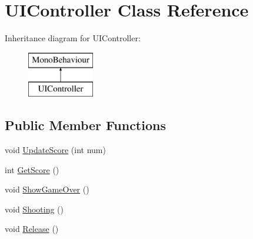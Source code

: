 \hypertarget{class_u_i_controller}{}\section{U\+I\+Controller Class Reference}
\label{class_u_i_controller}
Inheritance diagram for U\+I\+Controller\+:\begin{figure}[H]
\begin{center}
\leavevmode
\includegraphics[height=2.000000cm]{class_u_i_controller}
\end{center}
\end{figure}
\subsection*{Public Member Functions}
\begin{DoxyCompactItemize}
\item 
void \hyperlink{class_u_i_controller_a87a0993fd494e90a55c6414d75467dd7}{Update\+Score} (int num)
\item 
int \hyperlink{class_u_i_controller_a4d9cf4f88502ba97bf5b1956ba24773d}{Get\+Score} ()
\item 
void \hyperlink{class_u_i_controller_a0c9a9ed0d8276bed8374ee2ee484ff0f}{Show\+Game\+Over} ()
\item 
void \hyperlink{class_u_i_controller_a96b6e594843a18425eddbb2adc5ede02}{Shooting} ()
\item 
void \hyperlink{class_u_i_controller_a720867c07d063e353bd105d582ad3646}{Release} ()
\end{DoxyCompactItemize}
